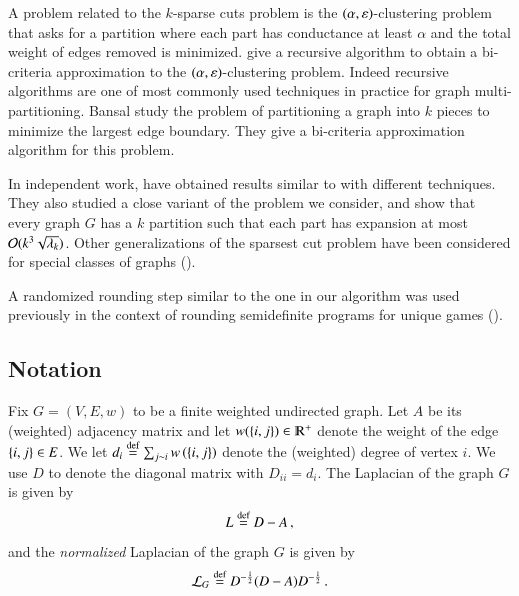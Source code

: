 \documentclass[11pt]{article}
\begin{document}
A problem related to the $k$-sparse cuts problem is the $(\alpha, \varepsilon)$-clustering
problem  that asks for a partition where each part has conductance at least $\alpha$ and the total
weight of edges removed is minimized.
%
\cite{kvv04} give a recursive algorithm to obtain a bi-criteria approximation to the $(\alpha, \varepsilon)$-clustering
problem.
%
Indeed recursive algorithms are one of most commonly used techniques in practice for graph multi-partitioning.
%
Bansal \etal \cite{bfk11} study the problem of partitioning a graph into $k$ pieces to minimize 
the largest edge boundary. They give a bi-criteria approximation algorithm for this problem.

In independent work, \cite{lot12} have obtained results similar to  with different techniques.
%
They also studied a close variant of the problem
we consider, and show that every graph $G$ has a $k$ partition such that each part has expansion at most
$\mathcal{O}(k^3 \sqrt{\lambda_k})$. 
%
Other generalizations of the sparsest cut problem have been considered for special
classes of graphs (\cite{blr10,k06, st96}).

A randomized rounding step similar to the one in our algorithm was used previously in the context of rounding
semidefinite programs for unique games (\cite{cmm06a}).







\subsection{Notation}
\label{sec:notation}
%
%
Fix $G = (V,E,w)$ to be a finite weighted undirected graph.
%
Let $A$ be its (weighted) adjacency matrix 
and let $w(\set{i,j}) \in \R^+$ denote the weight of the edge $\left\{i,j\right\} \in E$.
We let $d_i \stackrel{\textup{def}}{=} \sum_{j \sim i} w\left( \left\{i,j\right\}  \right ) $ denote the (weighted) degree
of vertex $i$. We use $D$ to denote the diagonal matrix with $D_{ii} =
d_i$.
%
The  Laplacian of the graph $G$ is given by
\[ L \stackrel{\textup{def}}{=} D - A   \,, \]
and the {\em normalized} Laplacian of the graph $G$ is given by
\[ \mathcal L_G \stackrel{\textup{def}}{=} D^{-\frac{1}{2}}(D-A)D^{-\frac{1}{2}} \,. \]
%
\end{document}
